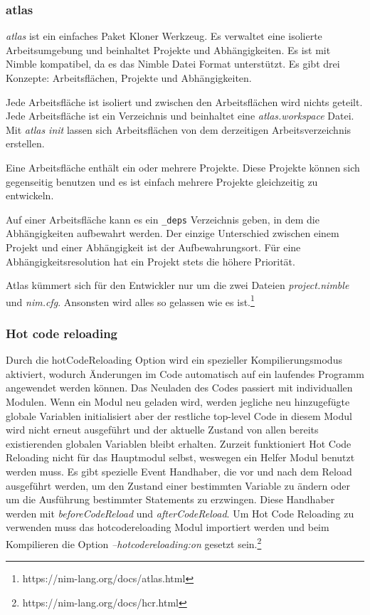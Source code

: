 \documentclass[11pt]{report}
\begin{document}
\subsubsection{atlas}
\emph{atlas} ist ein einfaches Paket Kloner Werkzeug. Es verwaltet eine isolierte Arbeitsumgebung und beinhaltet Projekte und Abhängigkeiten. Es ist mit Nimble kompatibel, da es das Nimble Datei Format unterstützt.
Es gibt drei Konzepte: Arbeitsflächen, Projekte und Abhängigkeiten.

Jede Arbeitsfläche ist isoliert und zwischen den Arbeitsflächen wird nichts geteilt. Jede Arbeitsfläche ist ein Verzeichnis und beinhaltet eine \emph{atlas.workspace} Datei. Mit \emph{atlas init} lassen sich Arbeitsflächen von dem derzeitigen Arbeitsverzeichnis erstellen.

Eine Arbeitsfläche enthält ein oder mehrere Projekte. Diese Projekte können sich gegenseitig benutzen und es ist einfach mehrere Projekte gleichzeitig zu entwickeln.

Auf einer Arbeitsfläche kann es ein \verb|_deps| Verzeichnis geben, in dem die Abhängigkeiten aufbewahrt werden. Der einzige Unterschied zwischen einem Projekt und einer Abhängigkeit ist der Aufbewahrungsort. Für eine Abhängigkeitsresolution hat ein Projekt stets die höhere Priorität.

Atlas kümmert sich für den Entwickler nur um die zwei Dateien \emph{project.nimble} und \emph{nim.cfg}. Ansonsten wird alles so gelassen wie es ist.\footnote{https://nim-lang.org/docs/atlas.html}

\subsubsection{Hot code reloading}
Durch die hotCodeReloading Option wird ein spezieller Kompilierungsmodus aktiviert, wodurch Änderungen im Code automatisch auf ein laufendes Programm angewendet werden können. Das Neuladen des Codes passiert mit individuallen Modulen. Wenn ein Modul neu geladen wird, werden jegliche neu hinzugefügte globale Variablen initialisiert aber der restliche top-level Code in diesem Modul wird nicht erneut ausgeführt und der aktuelle Zustand von allen bereits existierenden globalen Variablen bleibt erhalten. Zurzeit funktioniert Hot Code Reloading nicht für das Hauptmodul selbst, weswegen ein Helfer Modul benutzt werden muss. Es gibt spezielle Event Handhaber, die vor und nach dem Reload ausgeführt werden, um den Zustand einer bestimmten Variable zu ändern oder um die Ausführung bestimmter Statements zu erzwingen. Diese Handhaber werden mit \emph{beforeCodeReload} und \emph{afterCodeReload}. Um Hot Code Reloading zu verwenden muss das hotcodereloading Modul importiert werden und beim Kompilieren die Option \emph{--hotcodereloading:on} gesetzt sein.\footnote{https://nim-lang.org/docs/hcr.html}
\end{document}
